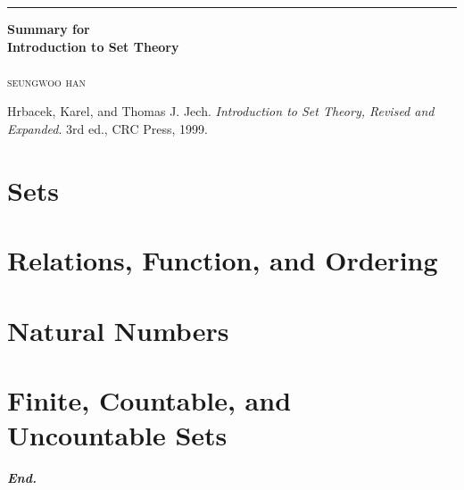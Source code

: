 \documentclass[a4paper,12pt]{report}
\begin{document}
\begin{titlepage}
	\raggedleft
	
	\rule{1pt}{\textheight}
	\hspace{0.05\textwidth}
	\parbox[b]{0.75\textwidth}{
		
		{\Huge\bfseries Summary for\\[0.5\baselineskip] Introduction to Set Theory}\\[2\baselineskip]
		\\[4\baselineskip]
		{\Large\textsc{seungwoo han}}
		
		\vspace{0.5\textheight} %
		
        {\noindent
        Hrbacek, Karel, and Thomas J. Jech.
        \textit{Introduction to Set Theory, Revised and Expanded}. 3rd ed.,
        CRC Press, 1999.}\\[\baselineskip]
	}
\end{titlepage}
\tikzexternaldisable
\tableofcontents
\tikzexternalenable
\hypersetup{
    colorlinks=true,
    linkcolor=red!50!black,
    filecolor=black,
    urlcolor=red!50!black,
}
\pagebreak

\chapter{Sets}\label{chap:sets}
% 
\chapter{Relations, Function, and Ordering}\label{chap:relFuncOrder}
% 
% 
% 
\chapter{Natural Numbers}\label{chap:nat}
% 
% 
% 
% 
\chapter{Finite, Countable, and Uncountable Sets}\label{chap:finite}



\vfill
\begin{center}
    \textbf{\textit{End.}}
\end{center}
\end{document}
